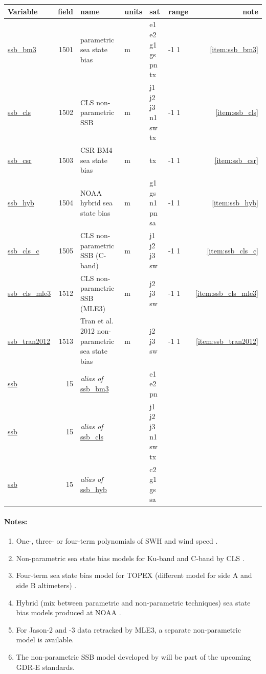 \documentclass[a4paper,11pt,openany,natbib,nomargin]{thesis}
\makeatletter
\newcommand\var[1]{\url{#1}\index{variables!#1@\protect\url{#1}}}
\newcommand\alias[1]{\emph{alias of} \var{#1}}
\newenvironment{vartable}{
\begin{table}[ht]
\small
\begin{tabular}{lrllllr}
\hline
Variable & field & name & units & sat & range & note \\
\hline
}{
\hline
\end{tabular}
\end{table}
}
\newenvironment{notes}[1][Notes:]{\FloatBarrier\paragraph{#1}\begin{enumerate}}{\end{enumerate}}
\makeatother
\begin{document}
\begin{vartable}
\var{ssb_bm3} & 1501 & parametric sea state bias & m & e1 e2 g1 gs pn tx & -1 1 & \ref{item:ssb_bm3} \\
\var{ssb_cls} & 1502 & CLS non-parametric SSB & m & j1 j2 j3 n1 sw tx       & -1 1 & \ref{item:ssb_cls} \\
\var{ssb_csr} & 1503 & CSR BM4 sea state bias & m & tx                & -1 1 & \ref{item:ssb_csr} \\
\var{ssb_hyb} & 1504 & NOAA hybrid sea state bias & m & g1 gs n1 pn sa & -1 1 & \ref{item:ssb_hyb} \\
\var{ssb_cls_c} & 1505 & CLS non-parametric SSB (C-band) & m & j1 j2 j3 sw & -1 1 & \ref{item:ssb_cls_c} \\
\var{ssb_cls_mle3} & 1512 & CLS non-parametric SSB (MLE3) & m & j2 j3 sw   & -1 1 & \ref{item:ssb_cls_mle3} \\
\var{ssb_tran2012} & 1513 & Tran et al. 2012 non-parametric sea state bias & m & j2 j3 sw & -1 1 & \ref{item:ssb_tran2012} \\
\hline
\var{ssb}     &   15 & \alias{ssb_bm3} && e1 e2 pn && \\
\var{ssb}     &   15 & \alias{ssb_cls} && j1 j2 j3 n1 sw tx && \\
\var{ssb}     &   15 & \alias{ssb_hyb} && c2 g1 gs sa && \\
\end{vartable}


\begin{notes}
\item One-, three- or four-term polynomials of SWH and wind speed \citep{gaspar1994a}.\label{item:ssb_bm3}
\item Non-parametric sea state bias models for Ku-band and C-band by CLS \citep{gaspar2002,labroue2004}.\label{item:ssb_cls}\label{item:ssb_cls_c}
\item Four-term sea state bias model for TOPEX (different model for side A and side B altimeters) \citep{chambers2003a}.\label{item:ssb_csr}
\item Hybrid (mix between parametric and non-parametric techniques) sea state bias models produced at NOAA \citep{scharroo2005e}.\label{item:ssb_hyb}
\item For Jason-2 and -3 data retracked by MLE3, a separate non-parametric model is available.\label{item:ssb_cls_mle3}
\item The non-parametric SSB model developed by \citet{tran2012} will be part of the upcoming GDR-E standards.\label{item:ssb_tran2012}
\end{notes}
\end{document}
